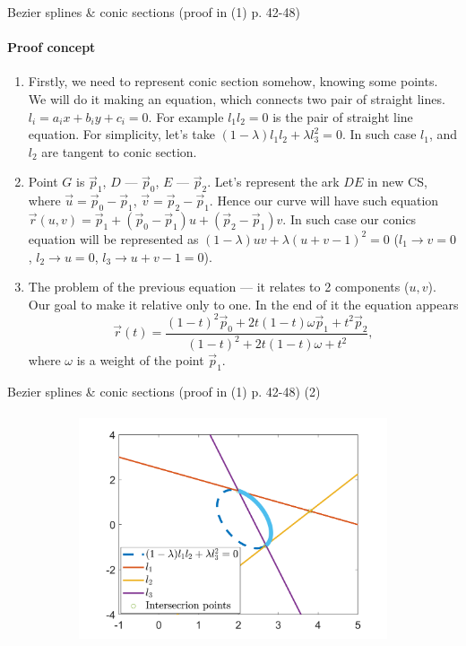 \documentclass[aspectratio=169]{beamer}
\begin{document}
\begin{frame}[t]{Bezier splines \& conic sections (proof in (1) p. 42-48)}
\framesubtitle{Proof concept}
    \footnotesize
    \vspace{-0.5cm}
    \begin{enumerate}
        \item Firstly, we need to represent conic section somehow, knowing some points. We will do it making an equation, which connects two pair of straight lines. $l_i=a_i x + b_i y + c_i = 0$. For example $l_1 l_2 = 0$ is the pair of straight line equation. For simplicity, let's take $(1-\lambda)l_1 l_2 + \lambda l_3^2 = 0$. In such case $l_1$, and $l_2$ are tangent to conic section.
        \pause
        \item Point $G$ is $\vec{p}_1$, $D$ --- $\vec{p}_0$, $E$ --- $\vec{p}_2$. Let's represent the ark $DE$ in new CS, where $\vec{u}=\vec{p}_0 - \vec{p}_1$, $\vec{v}=\vec{p}_2 - \vec{p}_1$. Hence our curve will have such equation $\vec{r}(u,v) = \vec{p}_1 + (\vec{p}_0 - \vec{p}_1)u + (\vec{p}_2 - \vec{p}_1)v$. In such case our conics equation will be represented as $(1-\lambda)u v + \lambda (u+v-1)^2 = 0$ ($l_1 \rightarrow v = 0 $, $l_2 \rightarrow u = 0 $, $l_3 \rightarrow u+v-1=0$).
        \pause
        \item The problem of the previous equation --- it relates to 2 components ($u, v$). Our goal to make it relative only to one. In the end of it the equation appears $$\vec{r}(t) = \dfrac{(1-t)^2\vec{p}_0 + 2t(1-t)\omega \vec{p}_1 + t^2 \vec{p}_2}{(1-t)^2+2t(1-t)\omega + t^2},$$ where $\omega$ is a weight of the point $\vec{p}_1$.

    \end{enumerate}
\end{frame}

\begin{frame}[t]{Bezier splines \& conic sections (proof in (1) p. 42-48) (2)}
    \framesubtitle{}
    \vspace{-0.5cm}
        \begin{figure}[H]
            \centering\includegraphics[height=6.5cm,width=1\textwidth,keepaspectratio]{bezier_to_conic.png}
            \label{fig:bezier_to_conic.png}
        \end{figure}
    \end{frame}
\end{document}
